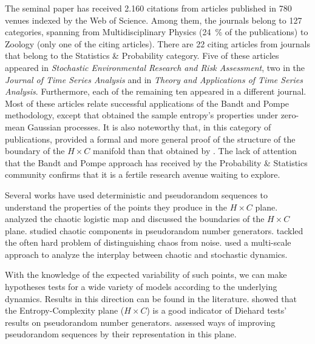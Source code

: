\documentclass[alpha-refs]{wiley-article}
\begin{document}
The seminal paper has received \num{2,160} citations from articles published in \num{780} venues indexed by the Web of Science.
Among them, the journals belong to \num{127} categories, spanning from Multidisciplinary Physics (\SI{24}{\percent} of the publications) to Zoology (only one of the citing articles).
There are \num{22} citing articles from journals that belong to the Statistics \& Probability category.
Five of these articles appeared in \textit{Stochastic Environmental Research and Risk Assessment}, 
two in the \textit{Journal of Time Series Analysis} and in 
\textit{Theory and Applications of Time Series Analysis}.
Furthermore, each of the remaining ten appeared in a different journal.
Most of these articles relate successful applications of the Bandt and Pompe methodology, except \cite{OrdinalPatternProbabilities} that obtained the sample entropy's properties under zero-mean Gaussian processes.
It is also noteworthy that, in this category of publications, \cite{DistributionsofOrderPatternsofIntervalMaps} provided a formal and more general proof of the structure of the boundary of the $H\times C$ manifold than that obtained by \cite{martin2006generalized}.
The lack of attention that the Bandt and Pompe approach has received by the Probability \& Statistics community confirms that it is a fertile research avenue waiting to explore.

Several works have used deterministic and pseudorandom sequences to understand the properties of the points they produce in the $H\times C$ plane.
\cite{martin2006generalized} analyzed the chaotic logistic map and discussed the boundaries of the $H \times C$ plane.
\cite{De_Micco_2009} studied chaotic components in pseudorandom number generators.
\cite{DistinguishingNoiseFromChaos}  tackled the often hard problem of distinguishing chaos from noise.
\cite{DistinguishingChaoticStochasticDynamicsTimeSeriesMultiscaleSymbolicApproach} used a multi-scale approach to analyze the interplay between chaotic and stochastic dynamics.

With the knowledge of the expected variability of such points, we can make hypotheses tests for a wide variety of models according to the underlying dynamics.
Results in this direction can be found in the literature.
\cite{RandomNumberGeneratorsCausality} showed that the Entropy-Complexity plane ($H\times C$) is a good indicator of Diehard tests' results on pseudorandom number generators.
\cite{De_Micco_2008} assessed ways of improving pseudorandom sequences by their representation in this plane.
\end{document}
